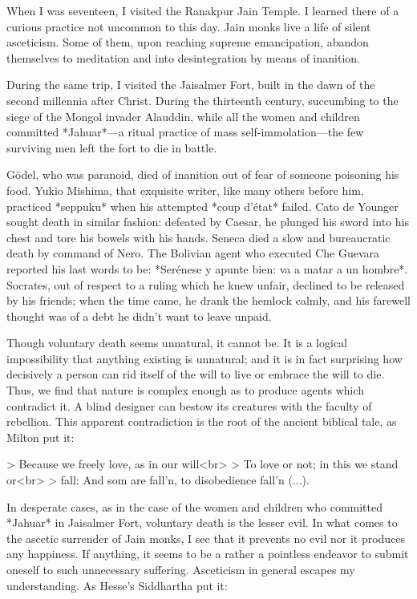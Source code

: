 \documentclass[a4paper, 12pt]{article}
\begin{document}
When I was seventeen, I visited the Ranakpur Jain Temple. I learned there of a
curious practice not uncommon to this day. Jain monks live a life of silent
asceticism. Some of them, upon reaching supreme emancipation, abandon
themselves to meditation and into desintegration by means of inanition.

During the same trip, I visited the Jaisalmer Fort, built in the dawn of
the second millennia after Christ. During the thirteenth century,
succumbing to the siege of the Mongol invader Alauddin, while all the
women and children committed *Jahuar*—a ritual practice of mass
self-immolation—the few surviving men left the fort to die in battle.

Gödel, who was paranoid, died of inanition out of fear of someone poisoning his
food. Yukio Mishima, that exquisite writer, like many others before him,
practiced *seppuku* when his attempted *coup d'état* failed. Cato de Younger
sought death in similar fashion: defeated by Caesar, he plunged his sword into
his chest and tore his bowels with his hands. Seneca died a slow and
bureaucratic death by command of Nero. The Bolivian agent who executed Che
Guevara reported his last words to be: *Serénese y apunte bien: va a matar a un
hombre*. Socrates, out of respect to a ruling which he knew unfair, declined to
be released by his friends; when the time came, he drank the hemlock calmly,
and his farewell thought was of a debt he didn't want to leave unpaid.

Though voluntary death seems unnatural, it cannot be. It is a logical
impossibility that anything existing is unnatural; and it is in fact surprising
how decisively a person can rid itself of the will to live or embrace the will
to die. Thus, we find that nature is complex enough as to produce agents which
contradict it. A blind designer can bestow its creatures with the faculty of
rebellion. This apparent contradiction is the root of the ancient biblical
tale, as Milton put it:

> Because we freely love, as in our will<br>
> To love or not; in this we stand or<br>
> fall: And som are fall'n, to disobedience fall'n (...).

In desperate cases, as in the case of the women and children who
committed *Jahuar* in Jaisalmer Fort, voluntary death is the lesser
evil. In what comes to the ascetic surrender of Jain monks, I see that
it prevents no evil nor it produces any happiness. If anything, it seems
to be a rather a pointless endeavor to submit oneself to such
unnecessary suffering. Asceticism in general escapes my understanding.
As Hesse's Siddhartha put it:
\end{document}
